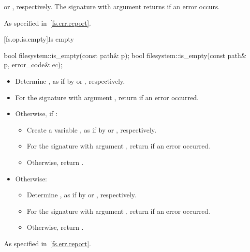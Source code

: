 \begin{itemdescr}
\pnum
\returns
{} or ,
  respectively. The signature with argument
   returns  if an error occurs.

\pnum
\throws
As specified in~\ref{fs.err.report}.
\end{itemdescr}


[fs.op.is.empty]{Is empty}

%
\begin{itemdecl}
bool filesystem::is_empty(const path& p);
bool filesystem::is_empty(const path& p, error_code& ec);
\end{itemdecl}

\begin{itemdescr}
\pnum
\effects
\begin{itemize}
\item Determine ,
   as if by  or , respectively.
\item For the signature with argument ,
   return  if an error occurred.
\item Otherwise, if :
  \begin{itemize}
  \item Create a variable ,
     as if by  or
     , respectively.
  \item For the signature with argument ,
     return  if an error occurred.
  \item Otherwise, return .
  \end{itemize}
\item
Otherwise:
  \begin{itemize}
  \item Determine ,
    as if by  or , respectively.
  \item For the signature with argument ,
    return  if an error occurred.
  \item Otherwise, return .
  \end{itemize}
\end{itemize}

\pnum
\throws
As specified in~\ref{fs.err.report}.
\end{itemdescr}


